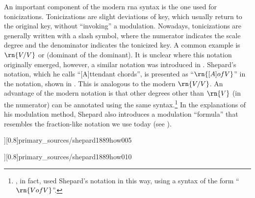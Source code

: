 




An important component of the modern \gls{rna} syntax is the
one used for tonicizations. Tonicizations are slight
deviations of key, which usually return to the original key,
without ``invoking'' a modulation. Nowadays, tonicizations
are generally written with a slash symbol, where the
numerator indicates the scale degree and the denominator
indicates the tonicized key. A common example is $\rn{V/V}$
or (dominant of the dominant). It is unclear where this
notation originally emerged, however, a similar notation was
introduced in \textcite{shepard1889how}. Shepard's notation,
which he calls ``[A]ttendant chords'', is presented as
``$\rn{[A] of V}$'' in the notation, shown in
. This is
analogous to the modern $\rn{V/V}$. An advantage of the
modern notation is that other degrees other than $\rn{V}$
(in the numerator) can be annotated using the same
syntax.\footnote{\textcite{piston1941harmony}, in fact, used
Shepard's notation in this way, using a syntax of the form
``$\rn{V of V}$''.} In the explanations of his modulation
method, Shepard also introduces a modulation ``formula''
that resembles the fraction-like notation we use today (see
). 

\phdfigure[Attendant chords in
\textcite[p.~5]{shepard1889how}][0.8]{primary_sources/shepard1889how005}

\phdfigure[Modulation formula in
 \textcite[p.~10]{shepard1889how}][0.8]{primary_sources/shepard1889how010}


